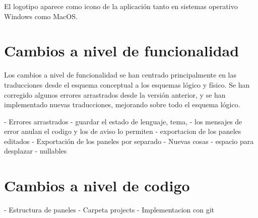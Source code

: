 El logotipo aparece como icono de la aplicación tanto en sistemas operativo Windows como MacOS.

\section{Cambios a nivel de funcionalidad}
Los cambios a nivel de funcionalidad se han centrado principalmente en las traducciones desde el esquema conceptual a los esquemas lógico y físico. Se han corregido algunos errores arrastrados desde la versión anterior, y se han implementado nuevas traducciones, mejorando sobre todo el esquema lógico.

- Errores arrastrados
- guardar el estado de lenguaje, tema,
- los mensajes de error anulan el codigo y los de aviso lo permiten
- exportacion de los paneles editados
- Exportación de los paneles por separado
- Nuevas cosas
- espacio para desplazar
- nullables

\section{Cambios a nivel de codigo}
- Estructura de paneles
- Carpeta projects
- Implementacion con git